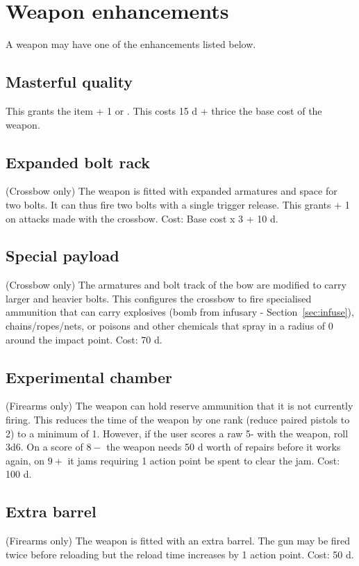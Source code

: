\documentclass[a4paper,11pt,oneside]{book}
\newcommand{\textlf}[1]{\textbf{\titlecap{#1}}}
\begin{document}
\section{Weapon enhancements}
A weapon may have one of the enhancements listed below. 

\subsection{Masterful quality}
This grants the item + 1 \textlf{Power} or \textlf{aim}. This costs 15 d + thrice the base cost of the weapon.

\subsection{Expanded bolt rack}
(Crossbow only) The weapon is fitted with expanded armatures and space for two bolts. It can thus fire two bolts with a single trigger release. This grants \textlf{Burst} + 1 on attacks made with the crossbow. Cost: Base cost x 3 + 10 d. 

\subsection{Special payload}
(Crossbow only) The armatures and bolt track of the bow are modified to carry larger and heavier bolts. This configures the crossbow to fire specialised ammunition that can carry explosives (bomb from infusary - Section~\ref{sec:infuse}), chains/ropes/nets, or poisons and other chemicals that spray in a radius of 0 around the impact point. Cost: 70 d.

\subsection{Experimental chamber}
(Firearms only) The weapon can hold reserve ammunition that it is not currently firing. This reduces the \textlf{Reload} time of the weapon by one rank (reduce paired pistols to \textlf{Reload} 2) to a minimum of 1. However, if the user scores a raw 5- with the weapon, roll 3d6. On a score of $8-$ the weapon needs 50 d worth of repairs before it works again, on $9+$ it jams requiring 1 action point be spent to clear the jam. Cost: 100 d.

\subsection{Extra barrel}
(Firearms only) The weapon is fitted with an extra barrel. The gun may be fired twice before reloading but the reload time increases by 1 action point. Cost: 50 d.
\end{document}
